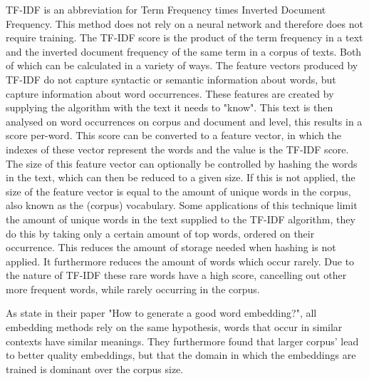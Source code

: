 \documentclass[../../Thesis.tex]{subfiles}
\begin{document}
\begin{jumpin}
TF-IDF is an abbreviation for Term Frequency times Inverted Document Frequency. This method does not rely on a neural network and therefore does not require training. The TF-IDF score is the product of the term frequency in a text and the inverted document frequency of the same term in a corpus of texts. Both of which can be calculated in a variety of ways. The feature vectors produced by TF-IDF do not capture syntactic or semantic information about words, but capture information about word occurrences. These features are created by supplying the algorithm with the text it needs to "know". This text is then analysed on word occurrences on corpus and document and level, this results in a score per-word. This score can be converted to a feature vector, in which the indexes of these vector represent the words and the value is the TF-IDF score. The size of this feature vector can optionally be controlled by hashing the words in the text, which can then be reduced to a given size. If this is not applied, the size of the feature vector is equal to the amount of unique words in the corpus, also known as the (corpus) vocabulary. Some applications of this technique limit the amount of unique words in the text supplied to the TF-IDF algorithm, they do this by taking only a certain amount of top words, ordered on their occurrence. This reduces the amount of storage needed when hashing is not applied. It furthermore reduces the amount of words which occur rarely. Due to the nature of TF-IDF these rare words have a high score, cancelling out other more frequent words, while rarely occurring in the corpus.

\end{jumpin}
As \citet{lai2016generate} state in their paper "How to generate a good word embedding?", all embedding methods rely on the same hypothesis, words that occur in similar contexts have similar meanings. They furthermore found that larger corpus' lead to better quality embeddings, but that the domain in which the embeddings are trained is dominant over the corpus size. 
\end{document}
